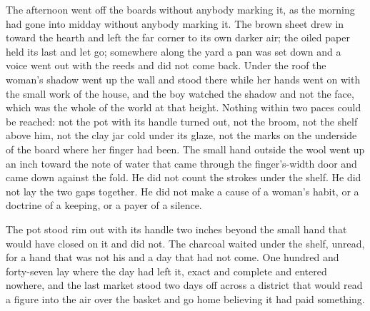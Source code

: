 The afternoon went off the boards without anybody marking it, as the morning had gone into midday without anybody marking it. The brown sheet drew in toward the hearth and left the far corner to its own darker air; the oiled paper held its last and let go; somewhere along the yard a pan was set down and a voice went out with the reeds and did not come back. Under the roof the woman's shadow went up the wall and stood there while her hands went on with the small work of the house, and the boy watched the shadow and not the face, which was the whole of the world at that height. Nothing within two paces could be reached: not the pot with its handle turned out, not the broom, not the shelf above him, not the clay jar cold under its glaze, not the marks on the underside of the board where her finger had been. The small hand outside the wool went up an inch toward the note of water that came through the finger's-width door and came down against the fold. He did not count the strokes under the shelf. He did not lay the two gaps together. He did not make a cause of a woman's habit, or a doctrine of a keeping, or a payer of a silence.

The pot stood rim out with its handle two inches beyond the small hand that would have closed on it and did not. The charcoal waited under the shelf, unread, for a hand that was not his and a day that had not come. One hundred and forty-seven lay where the day had left it, exact and complete and entered nowhere, and the last market stood two days off across a district that would read a figure into the air over the basket and go home believing it had paid something.
